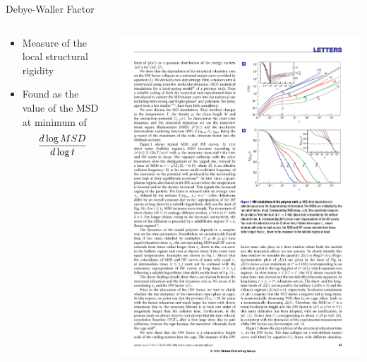 \documentclass[16pt, aspectratio=43,compress]{beamer}
\begin{document}
\begin{frame}{Debye-Waller Factor}
    \begin{columns}
        \begin{column}{0.5\linewidth}
            \begin{itemize}
                \item Measure of the local structural rigidity
                \item Found as the value of the MSD at minimum of 
                    \begin{equation*}
                        \frac{d \log{MSD}}{d \log{t}}
                    \end{equation*}
            \end{itemize}
        \end{column}
        \begin{column}{0.5\linewidth}
            \includegraphics[width=\linewidth]{DW-ex}\\
        \end{column}
    \end{columns}
\end{frame}
\end{document}
